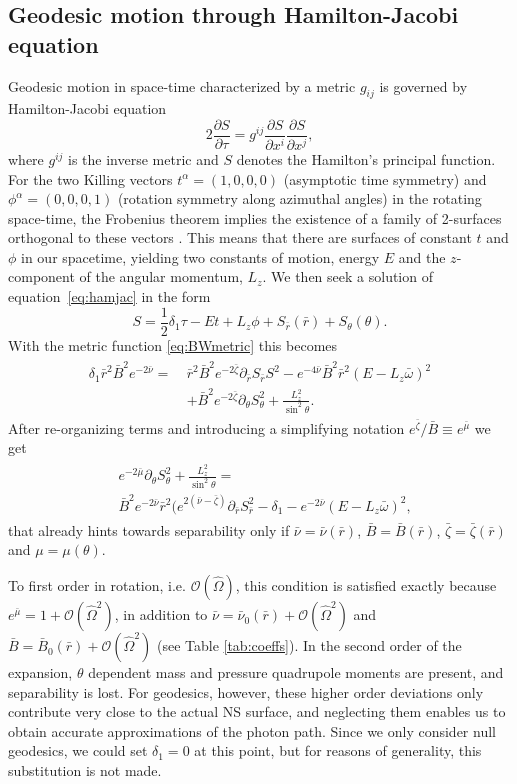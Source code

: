 \documentclass[iop, usenatbib]{emulateapj}
\newcommand{\be}{\begin{equation}}
\newcommand{\ee}{\end{equation}}
\newcommand{\pd}{\ensuremath{\partial}} %
\newcommand{\rb}{\ensuremath{\bar{r}}}
\newcommand{\wb}{\ensuremath{\bar{\omega}}}
\newcommand{\Ob}{\ensuremath{\hat{\Omega}}}
\newcommand{\nub}{\ensuremath{\bar{\nu}}}
\newcommand{\zetab}{\ensuremath{\bar{\zeta}}}
\newcommand{\Bb}{\ensuremath{\bar{B}}}
\newcommand{\mub}{\ensuremath{\bar{\mu}}}
\begin{document}
\subsection{Geodesic motion through Hamilton-Jacobi equation}\label{sect:hamjac}
Geodesic motion in space-time characterized by a metric $g_{ij}$ is governed by Hamilton-Jacobi equation
\be\label{eq:hamjac}
2\frac{\pd S}{\pd \tau} = g^{ij} \frac{\pd S}{\pd x^i}\frac{\pd S}{\pd x^j},
\ee
where $g^{ij}$ is the inverse metric and $S$ denotes the Hamilton's principal function.
For the two Killing vectors $t^{\alpha} = (1,0,0,0)$ (asymptotic time symmetry) and $\phi^{\alpha} = (0,0,0,1)$ (rotation symmetry along azimuthal angles) in the rotating space-time, the Frobenius theorem implies the existence of a family of 2-surfaces orthogonal to these vectors \citep[see e.g][p.12]{rcs}.  
This means that there are surfaces of constant $t$ and $\phi$ in our spacetime, yielding two constants of motion, energy $E$ and the $z$-component of the angular momentum, $L_z$.  
We then seek a solution of equation~\eqref{eq:hamjac} in the form
\be
S = \frac{1}{2}\delta_1 \tau - Et + L_z\phi + S_{\rb}(\rb) + S_{\theta}(\theta).
\ee
With the metric function \eqref{eq:BWmetric} this becomes
\begin{align}\begin{split} 
    \delta_1 \rb^2 \Bb^2 e^{-2\nub} =~& \rb^2 \Bb^2 e^{-2\zetab} \pd_{\rb}S_{\rb}S^2 - e^{-4\nub} \Bb^2 \rb^2 (E - L_z \wb)^2 \\
                                & + \Bb^2 e^{-2\zetab} \pd_{\theta}S_{\theta}^2 + \frac{L_z^2}{\sin^2\theta}.
\end{split}\end{align}
After re-organizing terms and introducing a simplifying notation $e^{\zetab}/\Bb \equiv e^{\mub}$ we get
\begin{align}\begin{split}\label{eq:S}
& e^{-2\mub}\pd_{\theta}S_{\theta}^2 + \frac{L_z^2}{\sin^2\theta} = \\ 
& \Bb^2 e^{-2\nub}\rb^2 ( e^{2(\nub-\zetab)} \pd_{\rb}S_{\rb}^2 -\delta_{1} - e^{-2\nub}(E - L_z \wb)^2,
\end{split}\end{align}
that already hints towards separability only if $\nub = \nub(\rb)$, $\Bb = \Bb(\rb)$, $\zetab = \zetab(\rb)$ and $\mu = \mu(\theta)$.

To first order in rotation, i.e. $\mathcal{O}(\Ob)$, this condition is satisfied exactly because $e^{\mub} = 1 + \mathcal{O}(\Ob^2)$, in addition to $\nub = \nub_0(\rb) + \mathcal{O}(\Ob^2)$ and $\Bb = \Bb_0(\rb) + \mathcal{O}(\Ob^2)$ (see Table \ref{tab:coeffs}).  
In the second order of the expansion, $\theta$ dependent mass and pressure quadrupole moments are present, and separability is lost.
For geodesics, however, these higher order deviations only contribute very close to the actual NS surface, and neglecting them enables us to obtain accurate approximations of the photon path.
Since we only consider null geodesics, we could set $\delta_1 = 0$ at this point, but for reasons of generality, this substitution is not made.
\end{document}
